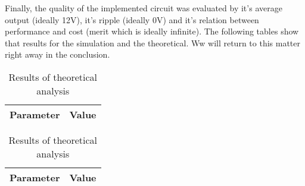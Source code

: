 \newpage
Finally, the quality of the implemented circuit was evaluated by it's average output (ideally 12V), it's ripple (ideally 0V) and it's relation between performance and cost (merit which is ideally infinite). The following tables show that results for the simulation and the theoretical. Ww will return to this matter right away in the conclusion.


\begin{table}[!htb]
  \begin{minipage}{.5\linewidth}
     \centering
  \begin{tabular}{|c|c|}
    \hline    
    {\bf Parameter} & {\bf Value} \\ \hline
    
 \end{tabular}
 \caption{Results of simulation analysis}
 \label{tab:sim}
  \end{minipage}%
    \hspace{2 mm}
    \begin{minipage}{.5\linewidth}
      \centering
        \begin{tabular}{|c|c|}
    \hline    
    {\bf Parameter} & {\bf Value} \\ \hline
    
 \end{tabular}
        \caption{Results of theoretical analysis}
        \label{comppar}
    \end{minipage} 
\end{table}



\newpage

